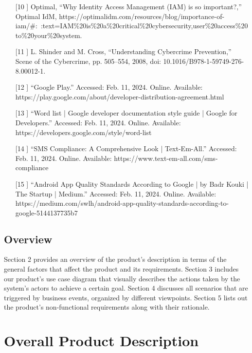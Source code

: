 \documentclass[]{article}
\begin{document}
\begin{itemize}
	\item[[10]] Optimal, “Why Identity Access Management (IAM) is so important?,” Optimal IdM, https://optimalidm.com/resources/blog/importance-of-iam/\#:~:text=IAM\%20is\%20a\%20critical\%20cybersecurity,user\%20access\%20to\%20your\%20system.
	\item[[11]] L. Shinder and M. Cross, “Understanding Cybercrime Prevention,” Scene of the Cybercrime, pp. 505–554, 2008, doi: 10.1016/B978-1-59749-276-8.00012-1.
	\item[[12]] “Google Play.” Accessed: Feb. 11, 2024. Online.
	Available: https://play.google.com/about/developer-distribution-agreement.html
	\item[[13]] “Word list  |  Google developer documentation style guide  |  Google for Developers.” Accessed: Feb. 11, 2024. Online. Available: https://developers.google.com/style/word-list
	\item[[14]] “SMS Compliance: A Comprehensive Look | Text-Em-All.” Accessed: Feb. 11, 2024. Online. Available: https://www.text-em-all.com/sms-compliance
	\item[[15]] “Android App Quality Standards According to Google | by Badr Kouki | The Startup | Medium.” Accessed: Feb. 11, 2024. Online. Available: https://medium.com/swlh/android-app-quality-standards-according-to-google-5144137735b7

\end{itemize}

\subsection{Overview}
\label{sub:overview}
Section 2 provides an overview of the product’s description in terms of the general factors that affect the product and its requirements. Section 3 includes our product’s use case diagram that visually describes the actions taken by the system’s actors to achieve a certain goal. Section 4 discusses all scenarios that are triggered by business events, organized by different viewpoints. Section 5 lists out the product’s non-functional requirements along with their rationale.


\section{Overall Product Description}
\label{sec:overall_description}
\end{document}
